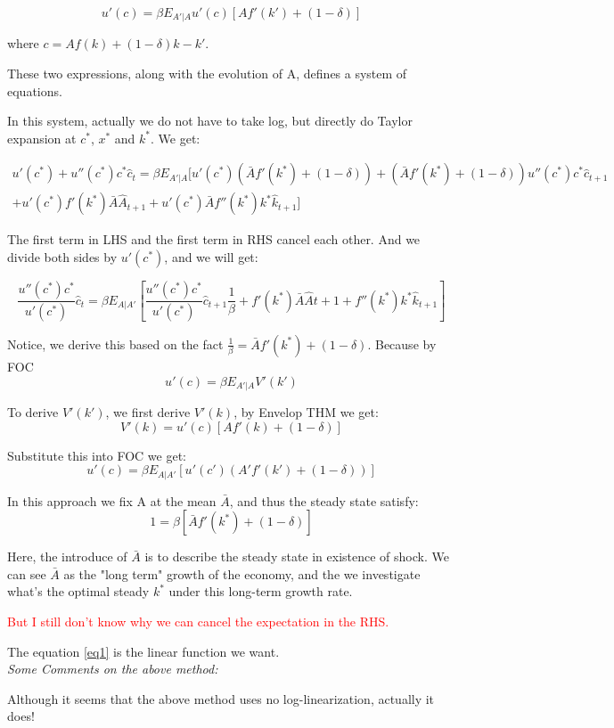 \documentclass{book}
\theoremstyle{plain}
\theoremstyle{definition}
\begin{document}
\[u'(c)=\beta E_{A'|A}u'(c)[Af'(k')+(1-\delta)]\]

where $c=Af(k)+(1-\delta)k-k'$.

These two expressions, along with the evolution of A,
defines a system of equations.

In this system, actually we do not have to take log,
but directly do Taylor expansion at $c^*$, $x^*$ and $k^*$.
We get:

\begin{multline}
u'(c^*)+u''(c^*)c^*\hat c_t=
\beta E_{A'|A}[u'(c^*)(\bar Af'(k^*)+(1-\delta))
+(\bar Af'(k^*)+(1-\delta))u''(c^*)c^*\hat c_{t+1}\\
+u'(c^*)f'(k^*)\bar A\hat A_{t+1}+
u'(c^*)\bar Af''(k^*)k^* \hat k_{t+1}]
\end{multline}


The first term in LHS and the first term in RHS cancel each other.
And we divide both sides by $u'(c^*)$, and we will get:

\begin{equation}\label{eq1}
\frac{u''(c^*)c^*}{u'(c^*)}\hat c_t
=\beta E_{A|A'}[\frac{u''(c^*)c^*}{u'(c^*)}\hat c_{t+1} \frac{1}{\beta}
+f'(k^*)\bar A \hat A{t+1}
+f''(k^*)k^*\hat k_{t+1}]
\end{equation}

Notice, we derive this based on the fact $\frac{1}{\beta}=\bar A f'(k^*)+(1-\delta)$.
Because by FOC
\[u'(c)=\beta E_{A'|A}V'(k')\]

To derive $V'(k')$, we first derive $V'(k)$,
by Envelop THM we get:
\[V'(k)=u'(c)[Af'(k)+(1-\delta)]\]

Substitute this into FOC we get:
\[u'(c)=\beta E_{A|A'}[u'(c')(A'f'(k')+(1-\delta))]\]

In this approach we fix A at the mean $\bar A$,
and thus the steady state satisfy:
\[1=\beta [\bar Af'(k^*)+(1-\delta)]\]

Here, the introduce of $\bar A$ is to describe the steady state in existence of shock.
We can see $\bar A$ as the "long term" growth of the economy,
and the we investigate what's the optimal steady $k^*$ under this long-term growth rate.

\textcolor{red}
{But I still don't know why we can cancel the expectation in the RHS.}

The equation \ref{eq1} is the linear function we want.\\

\noindent
\emph{Some Comments on the above method:}

Although it seems that the above method uses no log-linearization,
actually it does!
\end{document}
